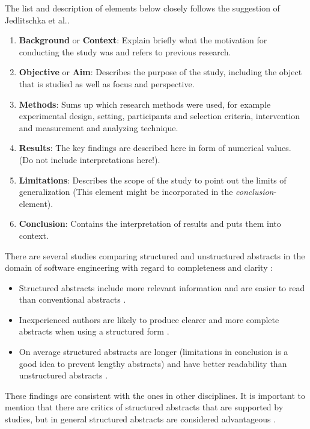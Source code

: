 The list and description of elements below closely follows the suggestion of Jedlitschka et al.\cite{Jedlitschka2008}.
\begin{enumerate}
	\item \textbf{Background} or \textbf{Context}: Explain briefly what the motivation for conducting the study was and refers to previous research.
	\item \textbf{Objective} or \textbf{Aim}: Describes the purpose of the study, including the object that is studied as well as focus and perspective. 
	\item \textbf{Methods}: Sums up which research methods were used, for example experimental design, setting, participants and selection criteria, intervention and measurement and analyzing technique.
	\item \textbf{Results}: The key findings are described here in form of numerical values.  (Do not include interpretations here!).
	\item \textbf{Limitations}: Describes the scope  of the study to point out the limits of generalization (This element might be incorporated in the \emph{conclusion}-element).
	\item \textbf{Conclusion}:  Contains the interpretation of results and puts them into context.
\end{enumerate}

There are several studies comparing structured and unstructured abstracts in the domain of software engineering with regard to completeness and clarity :

\begin{itemize}
\item Structured abstracts include more relevant information and are easier to read than conventional abstracts \cite{Budgen2007,Budgen2008}.
\item Inexperienced authors are likely to produce clearer and more complete abstracts when using a structured form \cite{Budgen2011} .
\item On average structured abstracts are longer (limitations in conclusion is a good idea to prevent lengthy abstracts) and have better readability than unstructured abstracts \cite{KBO2008}.
\end{itemize}
	
These findings are consistent with the ones in other disciplines. It is important to mention that there are critics of structured abstracts that are supported by studies, but in general structured abstracts are considered advantageous \cite{hartley2004,hartley2014}.	

